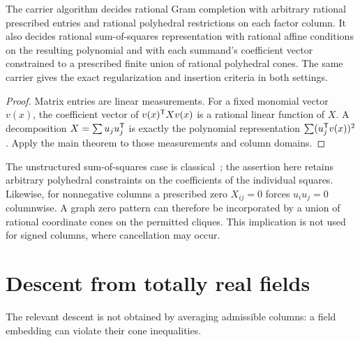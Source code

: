 \begin{corollary}\label{cor:applications}
The carrier algorithm decides rational Gram completion with arbitrary rational prescribed entries and rational polyhedral restrictions on each factor column. It also decides rational sum-of-squares representation with rational affine conditions on the resulting polynomial and with each summand's coefficient vector constrained to a prescribed finite union of rational polyhedral cones. The same carrier gives the exact regularization and insertion criteria in both settings.
\end{corollary}
\begin{proof}
Matrix entries are linear measurements. For a fixed monomial vector $v(x)$, the coefficient vector of $v(x)^{\mathsf T} Xv(x)$ is a rational linear function of $X$. A decomposition $X=\sum u_ju_j^{\mathsf T}$ is exactly the polynomial representation $\sum (u_j^{\mathsf T} v(x))^2$. Apply the main theorem to those measurements and column domains.
\end{proof}

The unstructured sum-of-squares case is classical~\cite{SEDZ,Scheiderer}; the assertion here retains arbitrary polyhedral constraints on the coefficients of the individual squares. Likewise, for nonnegative columns a prescribed zero $X_{ij}=0$ forces $u_i u_j=0$ columnwise. A graph zero pattern can therefore be incorporated by a union of rational coordinate cones on the permitted cliques. This implication is not used for signed columns, where cancellation may occur.

\section{Descent from totally real fields}\label{sec:descent}
The relevant descent is not obtained by averaging admissible columns: a field embedding can violate their cone inequalities.

